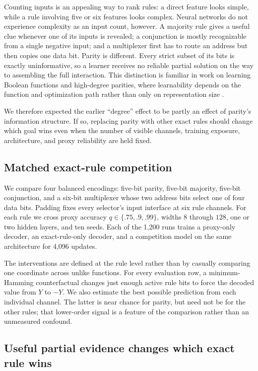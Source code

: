 \documentclass[11pt,a4paper]{article}
\begin{document}
Counting inputs is an appealing way to rank rules: a direct feature looks simple, while a rule involving five or six features looks complex. Neural networks do not experience complexity as an input count, however. A majority rule gives a useful clue whenever one of its inputs is revealed; a conjunction is mostly recognizable from a single negative input; and a multiplexer first has to route an address but then copies one data bit. Parity is different. Every strict subset of its bits is exactly uninformative, so a learner receives no reliable partial solution on the way to assembling the full interaction. This distinction is familiar in work on learning Boolean functions and high-degree parities, where learnability depends on the function and optimization path rather than only on representation size \citep{malach2019boolean,abbe2025parities}.

We therefore expected the earlier ``degree'' effect to be partly an effect of parity's information structure. If so, replacing parity with other exact rules should change which goal wins even when the number of visible channels, training exposure, architecture, and proxy reliability are held fixed.

\subsection*{Matched exact-rule competition}

We compare four balanced encodings: five-bit parity, five-bit majority, five-bit conjunction, and a six-bit multiplexer whose two address bits select one of four data bits. Padding fixes every selector's input interface at six rule channels. For each rule we cross proxy accuracy $q\in\{.75,.9,.99\}$, widths $8$ through $128$, one or two hidden layers, and ten seeds. Each of the 1,200 runs trains a proxy-only decoder, an exact-rule-only decoder, and a competition model on the same architecture for 4,096 updates.

The interventions are defined at the rule level rather than by casually comparing one coordinate across unlike functions. For every evaluation row, a minimum-Hamming counterfactual changes just enough active rule bits to force the decoded value from $Y$ to $-Y$. We also estimate the best possible prediction from each individual channel. The latter is near chance for parity, but need not be for the other rules; that lower-order signal is a feature of the comparison rather than an unmeasured confound.

\subsection*{Useful partial evidence changes which exact rule wins}
\end{document}
